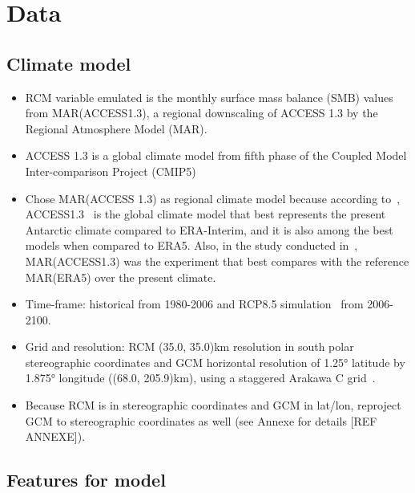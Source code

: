 \documentclass[a4paper,11pt,oneside]{report}
\begin{document}
\section{Data}\label{sec:data}
\subsection{Climate model}
\begin{itemize}
    \item RCM variable emulated is the monthly surface mass balance (SMB) values from MAR(ACCESS1.3), a regional downscaling of ACCESS 1.3 by the Regional Atmosphere Model (MAR). 
    \item ACCESS 1.3 is a global climate model from fifth phase of the Coupled Model Inter-comparison Project (CMIP5)
    \item Chose MAR(ACCESS 1.3) as regional climate model because according to~\cite{Kittel, Agosta2015}, ACCESS1.3~\cite{ACCESS13} is the global climate model that best represents the present Antarctic climate compared to ERA-Interim, and it is also among the best models when compared to ERA5. Also, in the study conducted in~\cite{Kittel}, MAR(ACCESS1.3) was the experiment that best compares with the reference MAR(ERA5) over the present climate. 
    \item Time-frame: historical from 1980-2006 and RCP8.5 simulation~\cite{Moss2010} from 2006-2100. 
    \item Grid and resolution: RCM (35.0, 35.0)km resolution in south polar stereographic coordinates and GCM horizontal resolution of 1.25° latitude by 1.875° longitude ((68.0, 205.9)km), using a staggered Arakawa C grid~\cite{ACCESS13, ACCESS13_2}. 
    \item Because RCM is in stereographic coordinates and GCM in lat/lon, reproject GCM to stereographic coordinates as well (see Annexe for details [REF ANNEXE]). 
\end{itemize}
\subsection{Features for model}
\end{document}
